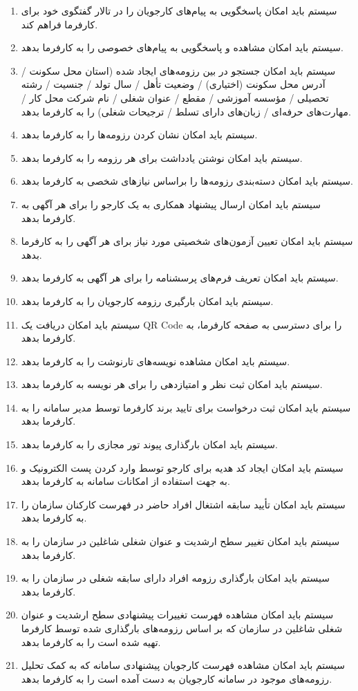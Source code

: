 \documentclass[12pt]{article}
\begin{document}
\begin{itemize}
\begin{enumerate}
			\item سیستم باید امکان پاسخگویی به پیام‌های کارجویان را در تالار گفتگوی خود برای کارفرما فراهم کند.
			\item سیستم باید امکان مشاهده و پاسخگویی به پیام‌های خصوصی را به کارفرما بدهد.
			\item سیستم باید امکان جستجو در بین رزومه‌های ایجاد شده (استان محل سکونت / آدرس محل سکونت (اختیاری) / وضعیت تأهل / سال تولد / جنسیت /  رشته تحصیلی / مؤسسه آموزشی / مقطع / عنوان شغلی / نام شرکت محل کار / مهارت‌های حرفه‌ای / زبان‌های دارای تسلط / ترجیحات شغلی) را به کارفرما بدهد.
			\item سیستم باید امکان نشان کردن رزومه‌ها را به کارفرما بدهد.
			\item سیستم باید امکان نوشتن یادداشت برای هر رزومه را به کارفرما بدهد.
			\item سیستم باید امکان دسته‌بندی رزومه‌ها را براساس نیازهای شخصی به کارفرما بدهد.
			\item سیستم باید امکان ارسال پیشنهاد همکاری به یک کارجو را برای هر آگهی به کارفرما بدهد.
			\item سیستم باید امکان تعیین آزمون‌های شخصیتی مورد نیاز برای هر آگهی را به کارفرما بدهد.
			\item سیستم باید امکان تعریف فرم‌های پرسشنامه را برای هر آگهی به کارفرما بدهد.
			\item سیستم باید امکان بارگیری رزومه کارجویان را به کارفرما بدهد.
			\item سیستم باید امکان دریافت یک QR Code را برای دسترسی به صفحه کارفرما، به کارفرما بدهد.
			\item سیستم باید امکان مشاهده نویسه‌های تارنوشت را به کارفرما بدهد.
			\item سیستم باید امکان ثبت نظر و امتیازدهی را برای هر نویسه به کارفرما بدهد.
			\item سیستم باید امکان ثبت درخواست برای تایید برند کارفرما توسط مدیر سامانه را به کارفرما بدهد.
			\item سیستم باید امکان بارگذاری پیوند تور مجازی را به کارفرما بدهد.
			\item سیستم باید امکان ایجاد کد هدیه برای کارجو توسط وارد کردن پست الکترونیک و به جهت استفاده از امکانات سامانه به کارفرما بدهد.
			\item سیستم باید امکان تأیید سابقه اشتغال افراد حاضر در فهرست کارکنان سازمان را به کارفرما بدهد.
			\item سیستم باید امکان تغییر سطح ارشدیت و عنوان شغلی شاغلین در سازمان را به کارفرما بدهد.
			\item سیستم باید امکان بارگذاری رزومه افراد دارای سابقه شغلی در سازمان را به کارفرما بدهد.
			\item سیستم باید امکان مشاهده فهرست تغییرات پیشنهادی سطح ارشدیت و عنوان شغلی شاغلین در سازمان که بر اساس رزومه‌های بارگذاری شده توسط کارفرما تهیه شده است را به کارفرما بدهد.
			\item سیستم باید امکان مشاهده فهرست کارجویان پیشنهادی سامانه که به کمک تحلیل رزومه‌های موجود در سامانه کارجویان به دست آمده است را به کارفرما بدهد.
		\end{enumerate}
	\end{itemize}
\end{document}
